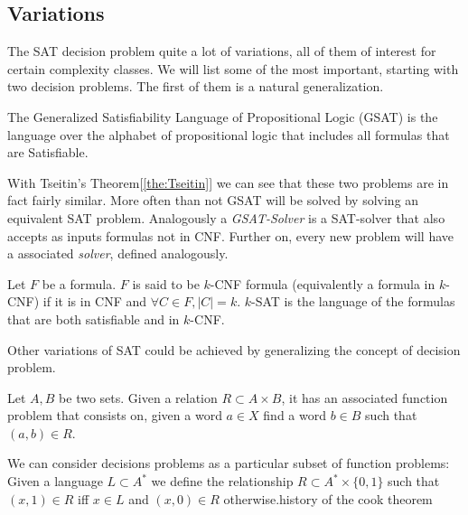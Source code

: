 \subsection{Variations}

The SAT decision problem quite a lot of variations, all of them of interest for certain complexity classes. We will list some of the most important, starting with two decision problems. The first of them is a natural generalization.

\begin{definition}
  The Generalized Satisfiability Language of Propositional Logic (GSAT) is the language over the alphabet of propositional logic that includes all formulas that are Satisfiable.
\end{definition}

With Tseitin's Theorem[\ref{the:Tseitin}] we can see that these two problems are in fact fairly similar. More often than not GSAT will be solved by solving an equivalent SAT problem. Analogously a \emph{GSAT-Solver}  is a SAT-solver that also accepts as inputs formulas not in CNF. Further on, every new problem will have a associated \emph{solver}, defined analogously.



\begin{definition}
  Let $F$ be a formula. $F$ is said to be $k$-CNF formula (equivalently a formula in $k$-CNF) if it is in CNF and $\forall C \in F, |C| = k$. $k$-SAT is the language of the formulas that are both satisfiable and in $k$-CNF.
\end{definition}

Other variations of SAT could be achieved by generalizing the concept of decision problem.

\begin{definition}
  Let $A,B$ be two sets. Given a relation $R\subset A\times B$, it has an associated function problem that consists on, given a word $a\in X$ find a word $b\in B$ such that $(a,b)\in R$.
\end{definition}

We can consider decisions problems as a particular subset of function problems: Given a language $L\subset A^*$ we define the relationship $R\subset A^*\times \{0,1\}$ such that $(x,1)\in R$ iff $x\in L$ and $(x,0)\in R$ otherwise.history of the cook theorem   

